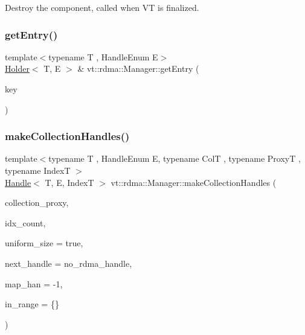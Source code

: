 Destroy the component, called when VT is finalized. 

\mbox{\label{structvt_1_1rdma_1_1_manager_a60c463246971a6d782e55f13fd60d092}} 
\subsubsection{\texorpdfstring{get\+Entry()}{getEntry()}}
{\footnotesize\ttfamily template$<$typename T , Handle\+Enum E$>$ \\
\hyperlink{structvt_1_1rdma_1_1_holder}{Holder}$<$ T, E $>$ \& vt\+::rdma\+::\+Manager\+::get\+Entry (\begin{DoxyParamCaption}\item[{\hyperlink{structvt_1_1rdma_1_1_handle_key}{Handle\+Key} const \&}]{key }\end{DoxyParamCaption})}

\mbox{\label{structvt_1_1rdma_1_1_manager_aad62be5c2cb0225139cf3d665b5fd7f2}} 
\subsubsection{\texorpdfstring{make\+Collection\+Handles()}{makeCollectionHandles()}}
{\footnotesize\ttfamily template$<$typename T , Handle\+Enum E, typename ColT , typename ProxyT , typename IndexT $>$ \\
\hyperlink{structvt_1_1rdma_1_1_handle}{Handle}$<$ T, E, IndexT $>$ vt\+::rdma\+::\+Manager\+::make\+Collection\+Handles (\begin{DoxyParamCaption}\item[{ProxyT}]{collection\+\_\+proxy,  }\item[{std\+::size\+\_\+t}]{idx\+\_\+count,  }\item[{bool}]{uniform\+\_\+size = {\ttfamily true},  }\item[{\hyperlink{namespacevt_a10442579ec4e7ebef223818e64bcf908}{R\+D\+M\+A\+\_\+\+Handle\+Type}}]{next\+\_\+handle = {\ttfamily no\+\_\+rdma\+\_\+handle},  }\item[{\hyperlink{namespacevt_af64846b57dfcaf104da3ef6967917573}{vt\+::\+Handler\+Type}}]{map\+\_\+han = {\ttfamily -\/1},  }\item[{IndexT}]{in\+\_\+range = {\ttfamily \{\}} }\end{DoxyParamCaption})}



